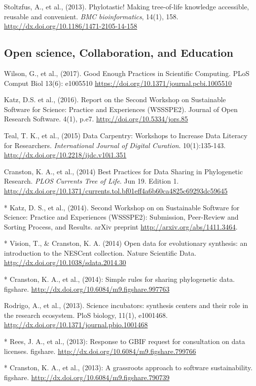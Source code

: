 \documentclass[10pt]{article}
\begin{document}
Stoltzfus, A., et al., (2013). Phylotastic! Making tree-of-life knowledge accessible, reusable and convenient. \textit{BMC bioinformatics}, 14(1), 158. \url{http://dx.doi.org/10.1186/1471-2105-14-158} 

\subsection*{Open science, Collaboration, and Education}
Wilson, G., et al., (2017). Good Enough Practices in Scientific Computing. PLoS Comput Biol 13(6): e1005510 \url{https://doi.org/10.1371/journal.pcbi.1005510}

Katz, D.S. et al., (2016). Report on the Second Workshop on Sustainable Software for Science: Practice and Experiences (WSSSPE2). Journal of Open Research Software. 4(1), p.e7. \url{http://doi.org/10.5334/jors.85}

Teal, T. K., et al., (2015) Data Carpentry: Workshops to Increase Data Literacy for Researchers. \textit{International Journal of Digital Curation}. 10(1):135-143. \url{http://dx.doi.org/10.2218/ijdc.v10i1.351}
 
Cranston, K. A., et al., (2014) Best Practices for Data Sharing in Phylogenetic Research. \textit{PLOS Currents Tree of Life}. Jun 19. Edition 1. \\
\url{http://dx.doi.org/10.1371/currents.tol.bf01eff4a6b60ca4825c69293dc59645} 

* Katz, D. S., et al., (2014). Second Workshop on on Sustainable Software for Science: Practice and Experiences (WSSSPE2): Submission, Peer-Review and Sorting Process, and Results. arXiv preprint \url{http://arxiv.org/abs/1411.3464}.

* Vision, T., \& Cranston, K. A. (2014) Open data for evolutionary synthesis: an introduction to the NESCent collection. Nature Scientific Data. \url{http://dx.doi.org/10.1038/sdata.2014.30}

* Cranston, K. A., et al., (2014): Simple rules for sharing phylogenetic data. figshare. \url{http://dx.doi.org/10.6084/m9.figshare.997763}

Rodrigo, A., et al., (2013). Science incubators: synthesis centers and their role in the research ecosystem. PloS biology, 11(1), e1001468. \url{http://dx.doi.org/10.1371/journal.pbio.1001468} 

* Rees, J. A., et al., (2013): Response to GBIF request for consultation on data licenses. figshare. \url{http://dx.doi.org/10.6084/m9.figshare.799766}

* Cranston, K. A., et al., (2013): A grassroots approach to software sustainability. figshare.
\url{http://dx.doi.org/10.6084/m9.figshare.790739}
\end{document}
